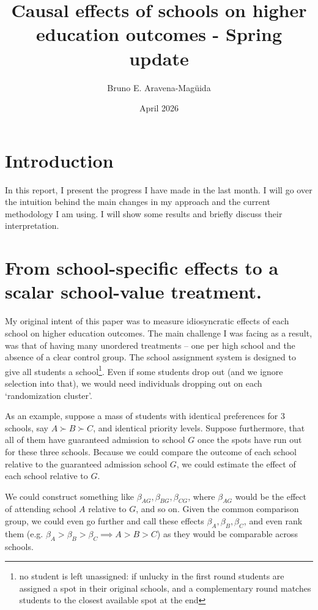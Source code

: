 \documentclass[a4paper, article, english, oneside, unknownkeysallowed, 12pt]{memoir}
\title{Causal effects of schools on higher education outcomes - Spring update}
\author{ Bruno E. Aravena-Magüida}
\date{April 2026}
\begin{document}
\maketitle

\setcounter{tocdepth}{2}
\renewcommand\contentsname{}

\section{Introduction}

In this report, I present the progress I have made in the last month. I will go over the intuition behind the main changes in my approach and the current methodology I am using.
I will show some results and briefly discuss their interpretation.


\section{From school-specific effects to a scalar school-value treatment.}

My original intent of this paper was to measure idiosyncratic effects of each school on higher education outcomes.
The main challenge I was facing as a result, was that of having many unordered treatments -- one per high school and the absence of a clear control group.
The school assignment system is designed to give all students a school\footnote{no student is left unassigned: if unlucky in the first round students are assigned a spot in their original schools, and a complementary round matches students to the closest available spot at the end}. Even if some students drop out (and we ignore selection into that), we would need individuals dropping out on each `randomization cluster'.

As an example, suppose a mass of students with identical preferences for 3 schools, say $A \succ B \succ C$, and identical priority levels. 
Suppose furthermore, that all of them have guaranteed admission to school $G$ once the spots have run out for these three schools. 
Because we could compare the outcome of each school relative to the guaranteed admission school $G$, we could estimate the effect of each school relative to $G$.   

We could construct something like $\beta_{AG}, \beta_{BG}, \beta_{CG}$, where $\beta_{AG}$ would be the effect of attending school $A$ relative to $G$, and so on.
Given the common comparison group, we could even go further and call these effects $\beta_{A}, \beta_{B}, \beta_{C}$, and even rank them (e.g.  $\beta_{A} > \beta_{B} > \beta_{C} \implies A > B > C$) as they would be comparable across schools.
\end{document}
